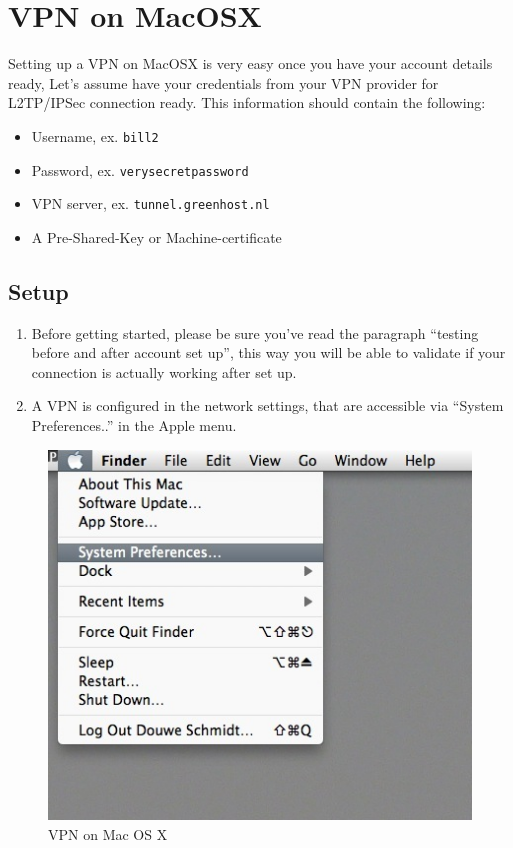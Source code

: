 \section{VPN on MacOSX}

Setting up a VPN on MacOSX is very easy once you have your account
details ready, Let's assume have your credentials from your VPN provider
for L2TP/IPSec connection ready. This information should contain the
following:

\begin{itemize}
\item
  Username, ex. \verb!bill2!
\item
  Password, ex. \verb!verysecretpassword!
\item
  VPN server, ex. \verb!tunnel.greenhost.nl!
\item
  A Pre-Shared-Key or Machine-certificate
\end{itemize}
\subsection{Setup}

\begin{enumerate}[1.]
\item
  Before getting started, please be sure you've read the paragraph
  ``testing before and after account set up'', this way you will be able
  to validate if your connection is actually working after set up.
\item
  A VPN is configured in the network settings, that are accessible via
  ``System Preferences..'' in the Apple menu.
\end{enumerate}
\begin{figure}[htbp]
\centering
\includegraphics{vpn_osx_02.jpg}
\caption{VPN on Mac OS X}
\end{figure}

